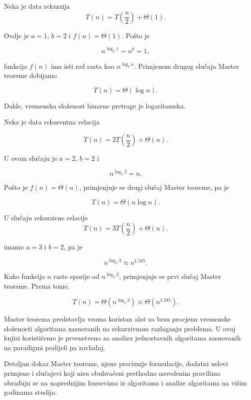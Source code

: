 \begin{example}
	 Neka je data rekurzija
	\[
	T(n)=T\left(\frac{n}{2}\right)+\Theta(1).
	\]
	
	Ovdje je $a=1$, $b=2$ i $f(n)=\Theta(1)$. Pošto je
	
	\[
	n^{\log_2 1}=n^0=1,
	\]
	
	funkcija $f(n)$ ima isti red rasta kao $n^{\log_b a}$. Primjenom drugog
	slučaja Master teoreme dobijamo
	
	\[
	T(n)=\Theta(\log n).
	\]
	
	Dakle, vremenska složenost binarne pretrage je logaritamska.
\end{example}

\begin{example}
Neka je data rekurentna relacija
	
	\[
	T(n)=2T\left(\frac{n}{2}\right)+\Theta(n).
	\]
	
	U ovom slučaju je $a=2$, $b=2$ i
	
	\[
	n^{\log_2 2}=n.
	\]
	
	Pošto je $f(n)=\Theta(n)$, primjenjuje se drugi slučaj Master teoreme, pa je
	
	\[
	T(n)=\Theta(n\log n).
	\]
\end{example}

\begin{example}
	U slučaju rekurzicne relacije
	\[
	T(n)=3T\left(\frac{n}{2}\right)+\Theta(n).
	\]
	
	imamo $a=3$ i $b=2$, pa je
	
	\[
	n^{\log_2 3}\approx n^{1.585}.
	\]
	
	Kako funkcija $n$ raste sporije od $n^{\log_2 3}$, primjenjuje se prvi slučaj
	Master teoreme. Prema tome,
	
	\[
	T(n)=\Theta\left(n^{\log_2 3}\right)
	\approx \Theta\left(n^{1.585}\right).
	\]
\end{example}

Master teorema predstavlja veoma koristan alat za brzu procjenu vremenske
složenosti algoritama zasnovanih na rekurzivnom razlaganju problema. U ovoj
knjizi koristićemo je prvenstveno za analizu jednostavnih algoritama zasnovanih
na paradigmi podijeli pa zavladaj.

Detaljan dokaz Master teoreme, njene preciznije formulacije, dodatni uslovi
primjene i slučajevi koji nisu obuhvaćeni prethodno navedenim pravilima
obrađuju se na naprednijim kursevima iz algoritama i analize algoritama na
višim godinama studija.



